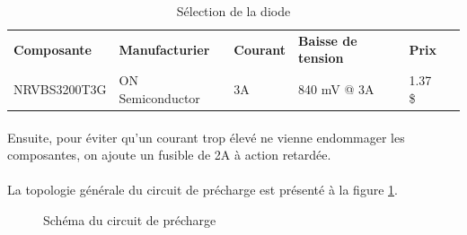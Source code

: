 		\begin{table}[H]
			\centering
			\caption{Sélection de la diode}
			\label{DiodePrecharge}
			\begin{tabular}{|p{3cm}|p{3cm}|p{3cm}|p{3cm}|p{3cm}|p{3cm}|}
				\hline
				\textbf{Composante} & \textbf{Manufacturier} & \textbf{Courant} &  \textbf{Baisse de tension} & \textbf{Prix}
				\\ \hhline{|=|=|=|=|=|=|}
				NRVBS3200T3G & ON Semiconductor & 3A & 840 mV @ 3A & 1.37 \$ \\ \hline		
			\end{tabular}
		\end{table}				
		
		\paragraph*{}			
		Ensuite, pour éviter qu'un courant trop élevé ne vienne endommager les composantes, on ajoute un fusible de 2A à action retardée. 
		
		\paragraph*{}			
		La topologie générale du circuit de précharge est présenté à la figure \ref{fig:circuitprecharge}.
				
		\begin{figure}[H]
			\centering
			\caption[]{Schéma du circuit de précharge}
			\label{fig:circuitprecharge}
		\end{figure}
			
		